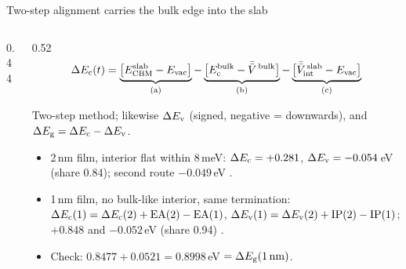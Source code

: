 \begin{frame}{Two-step alignment carries the bulk edge into the slab}
\begin{columns}[T,onlytextwidth]
\begin{column}{0.44\textwidth}
\par
      \raggedright
    \end{column}
    \begin{column}{0.52\textwidth}
      \footnotesize
      \[ \Delta E_{\mathrm{c}}(t) = \underbrace{\big[E_{\mathrm{CBM}}^{\mathrm{slab}} - E_{\mathrm{vac}}\big]}_{\text{(a)}}
         - \underbrace{\big[E_{\mathrm{c}}^{\mathrm{bulk}} - \bar{\bar{V}}^{\,\mathrm{bulk}}\big]}_{\text{(b)}}
         - \underbrace{\big[\bar{\bar{V}}^{\,\mathrm{slab}}_{\mathrm{int}} - E_{\mathrm{vac}}\big]}_{\text{(c)}} \]
      {\scriptsize Two-step method; likewise $\Delta E_{\mathrm{v}}$ (signed, negative =
        downwards), and $\Delta E_{\mathrm{g}} = \Delta E_{\mathrm{c}} - \Delta E_{\mathrm{v}}$.\par}
      \vspace{-0.3mm}
      \begin{itemize}
        \item 2\,nm film, interior flat within 8\,meV: $\Delta E_{\mathrm{c}} = +0.281$, $\Delta E_{\mathrm{v}} = -0.054$\,eV (share 0.84);
          second route $-0.049$\,eV .
        \item 1\,nm film, no bulk-like interior, same termination: $\Delta E_{\mathrm{c}}(1) = \Delta E_{\mathrm{c}}(2) + \mathrm{EA}(2) - \mathrm{EA}(1)$,
          $\Delta E_{\mathrm{v}}(1) = \Delta E_{\mathrm{v}}(2) + \mathrm{IP}(2) - \mathrm{IP}(1)$; $+0.848$ and $-0.052$\,eV (share 0.94) .
        \item Check: $0.8477 + 0.0521 = 0.8998$\,eV $= \Delta E_{\mathrm{g}}(1\,\mathrm{nm})$.
      \end{itemize}
    \end{column}
  \end{columns}
\end{frame}

